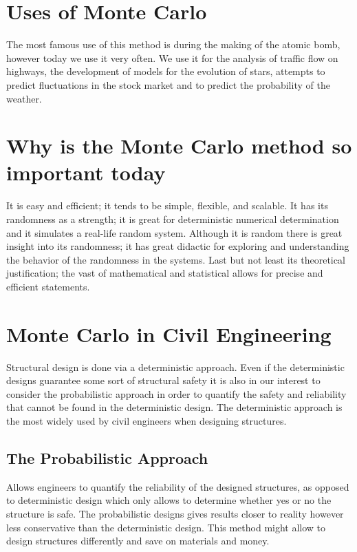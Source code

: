 \documentclass[twocolumn]{revtex4}
\begin{document}
\section{Uses of Monte Carlo}
The most famous use of this method is during the making of the atomic bomb, however today we use it very often. We use it for the analysis of traffic flow on highways, the development of models for the evolution of stars, attempts to predict fluctuations in the stock market and to predict the probability of the weather. 
 \section{Why is the Monte Carlo method so important today}
 
 It is easy and efficient; it tends to be simple, flexible, and scalable. It has its randomness as a strength; it is great for deterministic numerical determination and it simulates a real-life random system. Although it is random there is great insight into its randomness; it has great didactic for exploring and understanding the behavior of the randomness in the systems. Last but not least its theoretical justification; the vast of mathematical and statistical allows for precise and efficient statements. 
 
 
 \section{Monte Carlo in Civil Engineering}
 
 Structural design is done via a deterministic approach. Even if the deterministic designs guarantee some sort of structural safety it is also in our interest to consider the probabilistic approach in order to quantify the safety and reliability that cannot be found in the deterministic design. The deterministic approach is the most widely used by civil engineers when designing structures. 
 \subsection{The Probabilistic Approach}
 Allows engineers to quantify the reliability of the designed structures, as opposed to deterministic design which only allows to determine whether yes or no the structure is safe. The probabilistic designs gives results closer to reality however less conservative than the deterministic design. This method might allow to design structures differently and save on materials and money. 
\end{document}
